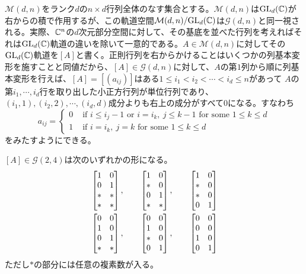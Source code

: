 \documentclass{ltjsreport}
\begin{document}
$\mathcal{M}(d,n)$をランク$d$の$n\times d$行列全体のなす集合とする。$\mathcal{M}(d,n)$は$\text{GL}_d(\mathbb{C})$が右からの積で作用するが、この軌道空間$\mathcal{M}(d,n)/\text{GL}_d(\mathbb{C})$は$\mathcal{G}(d,n)$と同一視される。実際、$\mathbb{C}^n$の$d$次元部分空間に対して、その基底を並べた行列を考えればそれは$\text{GL}_d(\mathbb{C})$軌道の違いを除いて一意的である。$A\in\mathcal{M}(d,n)$に対してその$\text{GL}_d(\mathbb{C})$軌道を$[A]$と書く。正則行列を右からかけることはいくつかの列基本変形を施すことと同値だから、$[A]\in\mathcal{G}(d,n)$に対して、$A$の第$1$列から順に列基本変形を行えば、$[A]=[(a_{ij})]$はある$1\leq i_1<i_2<\cdots<i_d\leq n$があって
$A$の第$i_1,\cdots,i_d$行を取り出した小正方行列が単位行列であり、$(i_1,1),(i_2,2),\cdots,(i_d,d)$成分よりも右上の成分がすべて$0$になる。すなわち
\begin{equation}\label{schubertcell}
a_{ij}=\left\{\begin{array}{cl}
  0 & \text{ if } i \leq i_{j}-1 \text{ or } i=i_k,\: j\leq k-1 \text{ for some $1\leq k\leq d$}\\
  1 & \text{ if } i = i_k,\: j = k \text{ for some $1\leq k\leq d$}
\end{array}\right.  
\end{equation}
をみたすようにできる。

\begin{eg}
  $[A]\in\mathcal{G}(2,4)$は次のいずれかの形になる。
  \begin{align*}
    &\begin{bmatrix} 
      1 & 0\\
      0 & 1\\
      * & *\\
      * & *
     \end{bmatrix},\qquad 
    \begin{bmatrix} 
      1 & 0\\
      * & 0\\
      0 & 1\\
      * & *
     \end{bmatrix},\qquad
    \begin{bmatrix} 
      1 & 0\\
      * & 0\\
      * & 0\\
      0 & 1
     \end{bmatrix}\\
    &\begin{bmatrix} 
      0 & 0\\
      1 & 0\\
      0 & 1\\
      * & *
     \end{bmatrix},\qquad
    \begin{bmatrix} 
      0 & 0\\
      1 & 0\\
      * & 0\\
      0 & 1
     \end{bmatrix},\qquad
    \begin{bmatrix} 
      0 & 0\\
      0 & 0\\
      1 & 0\\
      0 & 1
     \end{bmatrix}
  \end{align*}
  ただし$*$の部分には任意の複素数が入る。
\end{eg}
\end{document}
